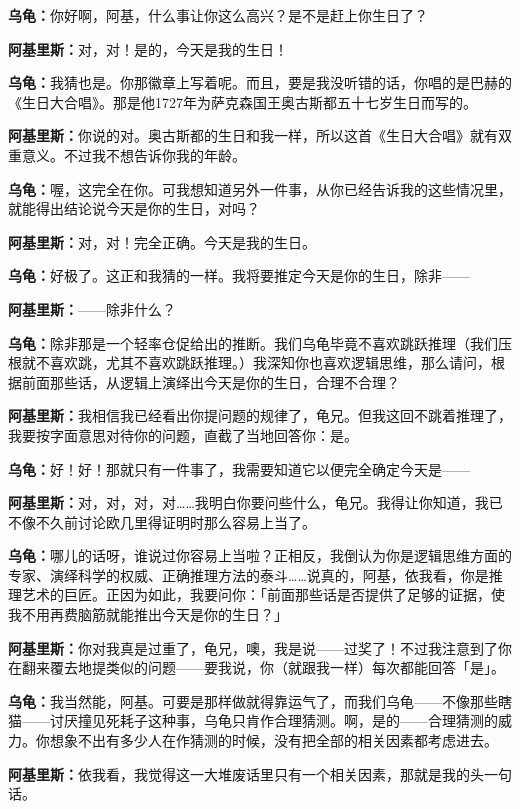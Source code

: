 \documentclass[
  12pt,
  twoside,
  openright,
  oldfontcommands,
]{memoir}
\newcommand{\dialogname}[1]{{\heifamily\bfseries #1}}
\begin{document}
\dialogname{乌龟：}你好啊，阿基，什么事让你这么高兴？是不是赶上你生日了？

\dialogname{阿基里斯：}对，对！是的，今天是我的生日！

\dialogname{乌龟：}我猜也是。你那徽章上写着呢。而且，要是我没听错的话，你唱的是巴赫的《生日大合唱》。那是他1727年为萨克森国王奥古斯都五十七岁生日而写的。

\dialogname{阿基里斯：}你说的对。奥古斯都的生日和我一样，所以这首《生日大合唱》就有双重意义。不过我不想告诉你我的年龄。

\dialogname{乌龟：}喔，这完全在你。可我想知道另外一件事，从你已经告诉我的这些情况里，就能得出结论说今天是你的生日，对吗？

\dialogname{阿基里斯：}对，对！完全正确。今天是我的生日。

\dialogname{乌龟：}好极了。这正和我猜的一样。我将要推定今天是你的生日，除非------

\dialogname{阿基里斯：}------除非什么？

\dialogname{乌龟：}除非那是一个轻率仓促给出的推断。我们乌龟毕竟不喜欢跳跃推理（我们压根就不喜欢跳，尤其不喜欢跳跃推理。）我深知你也喜欢逻辑思维，那么请问，根据前面那些话，从逻辑上演绎出今天是你的生日，合理不合理？

\dialogname{阿基里斯：}我相信我已经看出你提问题的规律了，龟兄。但我这回不跳着推理了，我要按字面意思对待你的问题，直截了当地回答你：是。

\dialogname{乌龟：}好！好！那就只有一件事了，我需要知道它以便完全确定今天是------

\dialogname{阿基里斯：}对，对，对，对\ldots\ldots 我明白你要问些什么，龟兄。我得让你知道，我已不像不久前讨论欧几里得证明时那么容易上当了。

\dialogname{乌龟：}哪儿的话呀，谁说过你容易上当啦？正相反，我倒认为你是逻辑思维方面的专家、演绎科学的权威、正确推理方法的泰斗\ldots\ldots 说真的，阿基，依我看，你是推理艺术的巨匠。正因为如此，我要问你：「前面那些话是否提供了足够的证据，使我不用再费脑筋就能推出今天是你的生日？」

\dialogname{阿基里斯：}你对我真是过重了，龟兄，噢，我是说------过奖了！不过我注意到了你在翻来覆去地提类似的问题------要我说，你（就跟我一样）每次都能回答「是」。

\dialogname{乌龟：}我当然能，阿基。可要是那样做就得靠运气了，而我们乌龟------不像那些瞎猫------讨厌撞见死耗子这种事，乌龟只肯作合理猜测。啊，是的------合理猜测的威力。你想象不出有多少人在作猜测的时候，没有把全部的相关因素都考虑进去。

\dialogname{阿基里斯：}依我看，我觉得这一大堆废话里只有一个相关因素，那就是我的头一句话。
\end{document}
